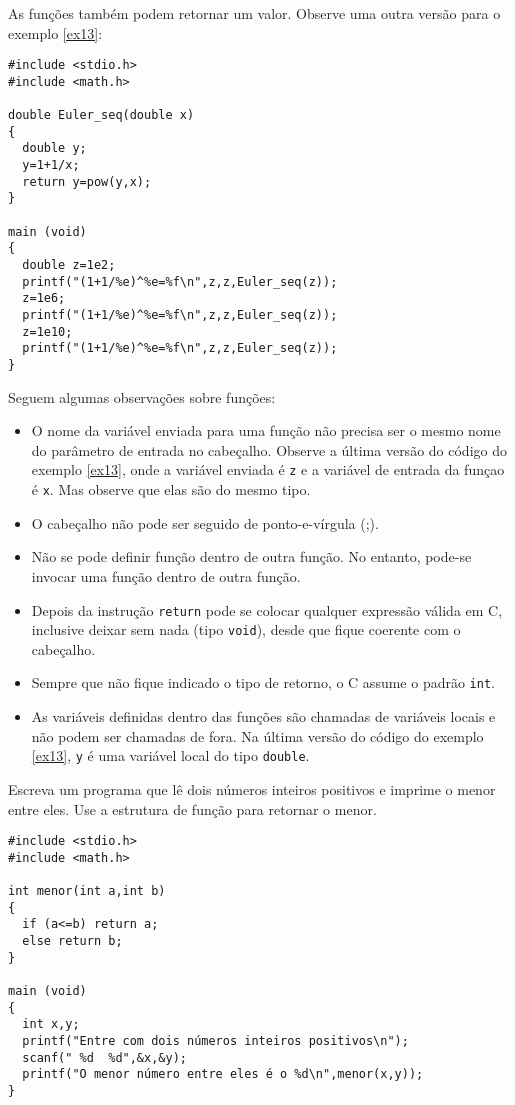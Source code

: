 As funções também podem retornar um valor. Observe uma outra versão para o exemplo \ref{ex13}:
\begin{verbatim}
#include <stdio.h>
#include <math.h>

double Euler_seq(double x)
{
  double y;
  y=1+1/x;
  return y=pow(y,x);
}

main (void)
{
  double z=1e2;
  printf("(1+1/%e)^%e=%f\n",z,z,Euler_seq(z));
  z=1e6;
  printf("(1+1/%e)^%e=%f\n",z,z,Euler_seq(z));
  z=1e10;
  printf("(1+1/%e)^%e=%f\n",z,z,Euler_seq(z));
}
\end{verbatim}
Seguem algumas observações sobre funções:
\begin{itemize}
 \item O nome da variável enviada para uma função não precisa ser o mesmo nome do parâmetro de entrada no cabeçalho. Observe a última versão do código do exemplo \ref{ex13}, onde a variável enviada é \verb|z| e a variável de entrada da funçao é \verb|x|. Mas observe que elas são do mesmo tipo.
 \item O cabeçalho não pode ser seguido de ponto-e-vírgula (;).
 \item Não se pode definir função dentro de outra função. No entanto, pode-se invocar uma função dentro de outra função.
 \item Depois da instrução \verb|return| pode se colocar qualquer expressão válida em C, inclusive deixar sem nada (tipo \verb|void|), desde que fique coerente com o cabeçalho.
 \item Sempre que não fique indicado o tipo de retorno, o C assume o padrão \verb|int|.
 \item As variáveis definidas dentro das funções são chamadas de variáveis locais e não podem ser chamadas de fora. Na última versão do código do exemplo \ref{ex13}, \verb|y| é uma variável local do tipo \verb|double|.
 \end{itemize}

 \begin{ex}Escreva um programa que lê dois números inteiros positivos e imprime o menor entre eles. Use a estrutura de função para retornar o menor.  
 \end{ex}
 \begin{verbatim}
#include <stdio.h>
#include <math.h>

int menor(int a,int b)
{
  if (a<=b) return a;
  else return b;
}

main (void)
{
  int x,y;
  printf("Entre com dois números inteiros positivos\n");
  scanf(" %d  %d",&x,&y);
  printf("O menor número entre eles é o %d\n",menor(x,y));
}
\end{verbatim}



